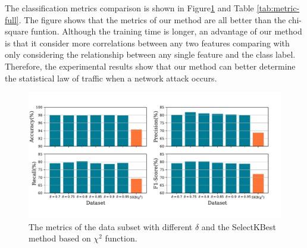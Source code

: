 \documentclass{ieeeaccess}
\theoremstyle{definition}
\begin{document}
The classification metrics comparison is shown in Figure\ref{fig:metrics-chi2} and Table \ref{tab:metric-full}. The figure shows that the metrics of our method are all better than the chi-square funtion. Although the training time is longer, an advantage of our method is that it consider more correlations between any two features comparing with only considering the relationship between any single feature and the class label. Therefore, the experimental results show that our method can better determine the statistical law of traffic when a network attack occurs.

\begin{figure}[!htpb]
    \centering
    \includegraphics[scale=0.35]{fig/metrics-chi2.pdf}
    \caption{The metrics of the data subset with different $\delta$ and the SelectKBest method based on $\chi^2$ function.}
    \label{fig:metrics-chi2}
\end{figure}

\end{document}
